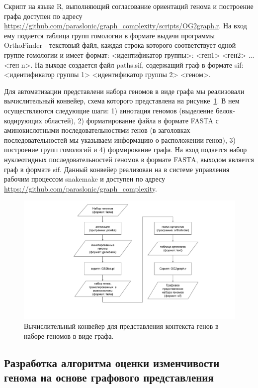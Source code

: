 Скрипт на языке R, выполняющий согласование ориентаций генома и построение графа доступен по адресу \url{https://github.com/paraslonic/graph_complexity/scripts/OG2graph.r}. На вход ему подается таблица групп гомологии в формате выдачи программы OrthoFinder - текстовый файл, каждая строка которого соответствует одной группе гомологии и имеет формат: <идентификатор группы>: <ген1> <ген2> ... <ген n>. На выходе создается файл paths.sif, содержащий граф в формате sif: <идентификатор группы 1> <идентификатор группы 2> <геном>. 

Для автоматизации представлени набора геномов в виде графа мы реализовали вычислительный конвейер, схема которого представлена на рисунке~\ref{img:graph_pipe_schema}. В нем осуществляются следующие шаги: 1) аннотация геномов (выделение белок-кодирующих областей), 2) форматирование файла в формате FASTA с аминокислотными последовательностями генов (в заголовках последовательностей мы указываем информацию о расположении генов), 3) построение групп гомологий и 4) формирование графа. На вход подается набор нуклеотидных последовательностей геномов в формате FASTA, выходом является граф в формате sif. Данный конвейер реализован на в системе управления рабочим процессом snakemake и доступен по адресу \url{https://github.com/paraslonic/graph_complexity}.

\begin{figure}[!ht] 
  \center
    \includegraphics [width=\textwidth] {Dissertation/images/graph/graph_complexity_schema.pdf}
    \caption{Вычислительный конвейер для представления контекста генов в наборе геномов в виде графа.}
    \label{img:graph_pipe_schema}
\end{figure}

\subsection{Разработка алгоритма оценки изменчивости генома на основе графового представления}

